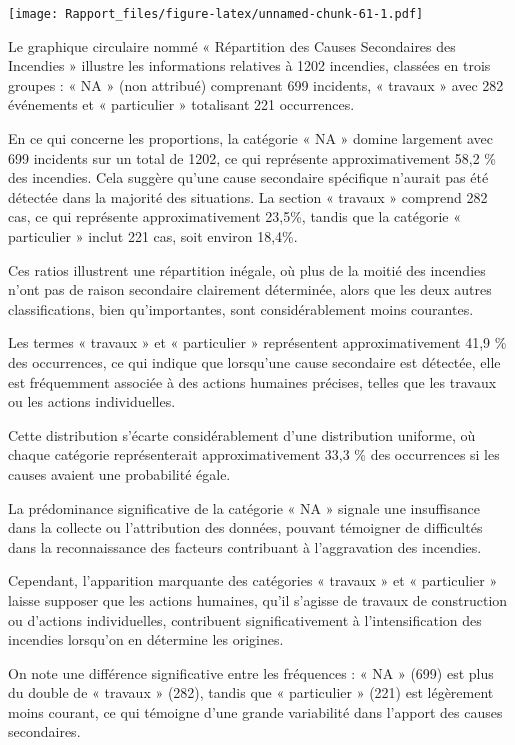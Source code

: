 \documentclass[
]{article}
\begin{document}
\texttt{[image: Rapport\_files/figure-latex/unnamed-chunk-61-1.pdf]}

Le graphique circulaire nommé « Répartition des Causes Secondaires des
Incendies » illustre les informations relatives à 1202 incendies,
classées en trois groupes : « NA » (non attribué) comprenant 699
incidents, « travaux » avec 282 événements et « particulier » totalisant
221 occurrences.

En ce qui concerne les proportions, la catégorie « NA » domine largement
avec 699 incidents sur un total de 1202, ce qui représente
approximativement 58,2 \% des incendies. Cela suggère qu'une cause
secondaire spécifique n'aurait pas été détectée dans la majorité des
situations. La section « travaux » comprend 282 cas, ce qui représente
approximativement 23,5\%, tandis que la catégorie « particulier » inclut
221 cas, soit environ 18,4\%.

Ces ratios illustrent une répartition inégale, où plus de la moitié des
incendies n'ont pas de raison secondaire clairement déterminée, alors
que les deux autres classifications, bien qu'importantes, sont
considérablement moins courantes.

Les termes « travaux » et « particulier » représentent approximativement
41,9 \% des occurrences, ce qui indique que lorsqu'une cause secondaire
est détectée, elle est fréquemment associée à des actions humaines
précises, telles que les travaux ou les actions individuelles.

Cette distribution s'écarte considérablement d'une distribution
uniforme, où chaque catégorie représenterait approximativement 33,3 \%
des occurrences si les causes avaient une probabilité égale.

La prédominance significative de la catégorie « NA » signale une
insuffisance dans la collecte ou l'attribution des données, pouvant
témoigner de difficultés dans la reconnaissance des facteurs contribuant
à l'aggravation des incendies.

Cependant, l'apparition marquante des catégories « travaux » et «
particulier » laisse supposer que les actions humaines, qu'il s'agisse
de travaux de construction ou d'actions individuelles, contribuent
significativement à l'intensification des incendies lorsqu'on en
détermine les origines.

On note une différence significative entre les fréquences : « NA » (699)
est plus du double de « travaux » (282), tandis que « particulier »
(221) est légèrement moins courant, ce qui témoigne d'une grande
variabilité dans l'apport des causes secondaires.
\end{document}
